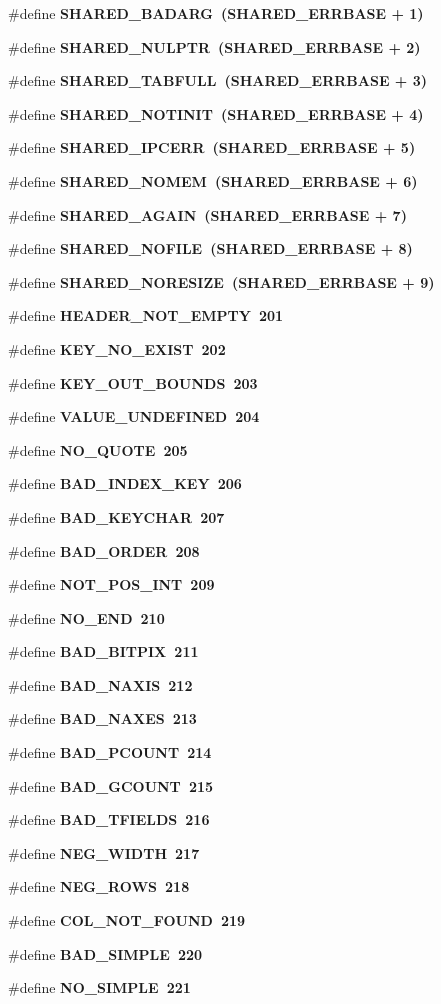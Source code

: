 \begin{CompactItemize}
\#define \bf{SHARED\_\-BADARG}~(SHARED\_\-ERRBASE + 1)
\item 
\#define \bf{SHARED\_\-NULPTR}~(SHARED\_\-ERRBASE + 2)
\item 
\#define \bf{SHARED\_\-TABFULL}~(SHARED\_\-ERRBASE + 3)
\item 
\#define \bf{SHARED\_\-NOTINIT}~(SHARED\_\-ERRBASE + 4)
\item 
\#define \bf{SHARED\_\-IPCERR}~(SHARED\_\-ERRBASE + 5)
\item 
\#define \bf{SHARED\_\-NOMEM}~(SHARED\_\-ERRBASE + 6)
\item 
\#define \bf{SHARED\_\-AGAIN}~(SHARED\_\-ERRBASE + 7)
\item 
\#define \bf{SHARED\_\-NOFILE}~(SHARED\_\-ERRBASE + 8)
\item 
\#define \bf{SHARED\_\-NORESIZE}~(SHARED\_\-ERRBASE + 9)
\item 
\#define \bf{HEADER\_\-NOT\_\-EMPTY}~201
\item 
\#define \bf{KEY\_\-NO\_\-EXIST}~202
\item 
\#define \bf{KEY\_\-OUT\_\-BOUNDS}~203
\item 
\#define \bf{VALUE\_\-UNDEFINED}~204
\item 
\#define \bf{NO\_\-QUOTE}~205
\item 
\#define \bf{BAD\_\-INDEX\_\-KEY}~206
\item 
\#define \bf{BAD\_\-KEYCHAR}~207
\item 
\#define \bf{BAD\_\-ORDER}~208
\item 
\#define \bf{NOT\_\-POS\_\-INT}~209
\item 
\#define \bf{NO\_\-END}~210
\item 
\#define \bf{BAD\_\-BITPIX}~211
\item 
\#define \bf{BAD\_\-NAXIS}~212
\item 
\#define \bf{BAD\_\-NAXES}~213
\item 
\#define \bf{BAD\_\-PCOUNT}~214
\item 
\#define \bf{BAD\_\-GCOUNT}~215
\item 
\#define \bf{BAD\_\-TFIELDS}~216
\item 
\#define \bf{NEG\_\-WIDTH}~217
\item 
\#define \bf{NEG\_\-ROWS}~218
\item 
\#define \bf{COL\_\-NOT\_\-FOUND}~219
\item 
\#define \bf{BAD\_\-SIMPLE}~220
\item 
\#define \bf{NO\_\-SIMPLE}~221
\item 

\end{CompactItemize}

